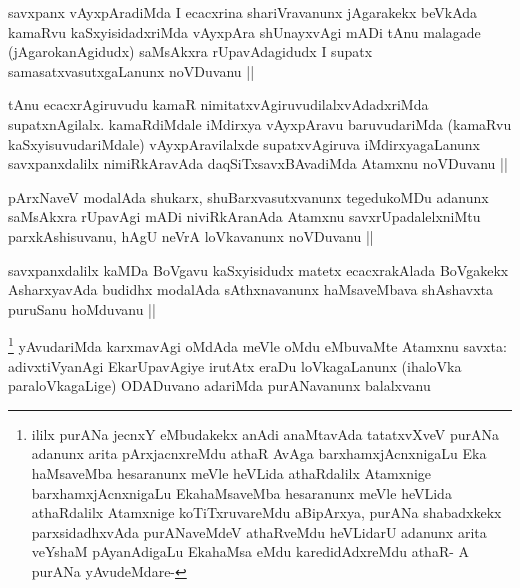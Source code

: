 \begin{artha}
savxpanx vAyxpAradiMda I ecacxrina shariVravanunx jAgarakekx beVkAda kamaRvu kaSxyisidadxriMda vAyxpAra shUnayxvAgi mADi tAnu malagade (jAgarokanAgidudx) saMsAkxra rUpavAdagidudx I supatx samasatxvasutxgaLanunx noVDuvanu ||
\end{artha}


\begin{artha}
tAnu ecacxrAgiruvudu kamaR nimitatxvAgiruvudilalxvAdadxriMda supatxnAgilalx. kamaRdiMdale iMdirxya vAyxpAravu baruvudariMda (kamaRvu kaSxyisuvudariMdale) vAyxpAravilalxde supatxvAgiruva iMdirxyagaLanunx savxpanxdalilx nimiRkAravAda daqSiTxsavxBAvadiMda Atamxnu noVDuvanu ||
\end{artha}


\begin{artha}
pArxNaveV modalAda shukarx, shuBarxvasutxvanunx tegedukoMDu adanunx saMsAkxra rUpavAgi mADi niviRkAranAda Atamxnu savxrUpadalelxniMtu parxkAshisuvanu, hAgU neVrA loVkavanunx noVDuvanu ||
\end{artha}


\begin{artha}
savxpanxdalilx kaMDa BoVgavu kaSxyisidudx matetx ecacxrakAlada BoVgakekx AsharxyavAda budidhx modalAda sAthxnavanunx haMsaveMbava shAshavxta puruSanu hoMduvanu ||
\end{artha}


\begin{artha}
\footnote[1]{ililx purANa jecnxY eMbudakekx anAdi anaMtavAda tatatxvXveV purANa adanunx arita pArxjacnxreMdu athaR AvAga barxhamxjAcnxnigaLu Eka haMsaveMba hesaranunx meVle heVLida athaRdalilx Atamxnige barxhamxjAcnxnigaLu EkahaMsaveMba hesaranunx meVle heVLida athaRdalilx Atamxnige koTiTxruvareMdu aBipArxya, purANa shabadxkekx parxsidadhxvAda purANaveMdeV athaRveMdu heVLidarU adanunx arita veYshaM pAyanAdigaLu EkahaMsa eMdu karedidAdxreMdu athaR- A purANa yAvudeMdare- \stext}
yAvudariMda karxmavAgi oMdAda meVle oMdu eMbuvaMte Atamxnu savxta: adivxtiVyanAgi EkarUpavAgiye irutAtx eraDu loVkagaLanunx (ihaloVka paraloVkagaLige) ODADuvano adariMda purANavanunx balalxvanu
\end{artha}

